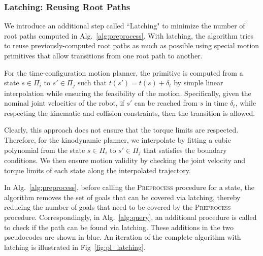 \documentclass[a4paper]{report}
\begin{document}
%

\subsubsection{Latching: Reusing Root Paths}
\label{latching}
We introduce an additional step called ``Latching" to minimize the number of root paths computed in Alg.~\ref{alg:preprocess}. With latching, the algorithm tries to reuse previously-computed root paths as much as possible using special motion primitives that allow transitions from one root path to another.

For the time-configuration motion planner, the primitive is computed from a state $s \in \Pi_i$ to $s' \in \Pi_j$ such that $t(s') = t(s) + \delta_t$ by simple linear interpolation while ensuring the feasibility of the motion. Specifically, given the nominal joint velocities of the robot, if $s'$ can be reached from $s$ in time $\delta_t$, while respecting the kinematic and collision constraints, then the transition is allowed.

Clearly, this approach does not ensure that the torque limits are respected. Therefore, for the kinodynamic planner, we interpolate by fitting a cubic polynomial from the state $s \in \Pi_i$ to $s' \in \Pi_j$ that satisfies the boundary conditions. We then ensure motion validity by checking the joint velocity and torque limits of each state along the interpolated trajectory.

In Alg.~\ref{alg:preprocess}, before calling the \textsc{Preprocess} procedure for a state, the algorithm removes the set of goals that can be covered via latching, thereby reducing the number of goals that need to be covered by the \textsc{Preprocess} procedure. Correspondingly, in Alg.~\ref{alg:query}, an additional procedure is called to check if the path can be found via latching. These additions in the two pseudocodes are shown in blue. An iteration of the complete algorithm with latching is illustrated in Fig~\ref{fig:pl_latching}.
\end{document}
